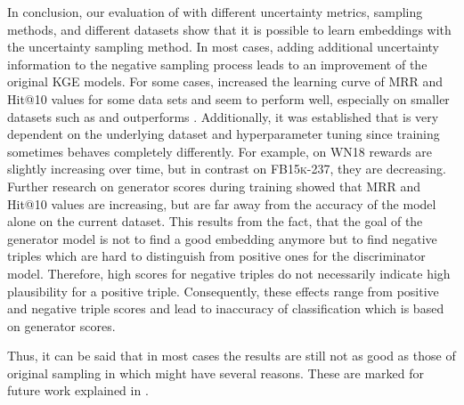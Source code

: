 In conclusion, our evaluation of \usgan with different uncertainty metrics, sampling methods, and different datasets show that it is possible to learn embeddings with the uncertainty sampling method.
In most cases, adding additional uncertainty information to the negative sampling process leads to an improvement of the original \ac{KGE} models.
For some cases, \usgan increased the learning curve of MRR and Hit@10 values for some data sets and seem to perform well, especially on smaller datasets such as \umls and outperforms \kbgan.
Additionally, it was established that \usgan is very dependent on the underlying dataset and hyperparameter tuning since training sometimes behaves completely differently.
For example, on \textsc{WN18} rewards are slightly increasing over time, but in contrast on \textsc{FB15k-237}, they are decreasing.
Further research on generator scores during training showed that MRR and Hit@10 values are increasing, but are far away from the accuracy of the model alone on the current dataset.
This results from the fact, that the goal of the generator model is not to find a good embedding anymore but to find negative triples which are hard to distinguish from positive ones for the discriminator model.
Therefore, high scores for negative triples do not necessarily indicate high plausibility for a positive triple.
Consequently, these effects range from positive and negative triple scores and lead to inaccuracy of classification which is based on generator scores.

Thus, it can be said that in most cases the results are still not as good as those of original sampling in \kbgan which might have several reasons.
These are marked for future work explained in .
